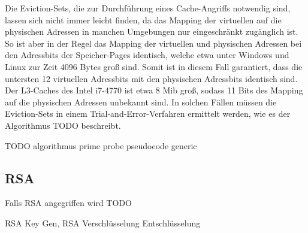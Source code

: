Die Eviction-Sets, die zur Durchführung eines Cache-Angriffs notwendig sind, lassen sich nicht immer leicht finden, da das Mapping der virtuellen auf die physischen Adressen in manchen Umgebungen nur eingeschränkt zugänglich ist.
So ist aber in der Regel das Mapping der virtuellen und physischen Adressen bei den Adressbits der Speicher-Pages identisch, welche etwa unter Windows und Linux zur Zeit 4096 Bytes groß sind. Somit ist in diesem Fall garantiert, dass die untersten 12 virtuellen Adressbits mit den physischen Adressbits identisch sind. Der L3-Caches des Intel i7-4770 ist etwa 8 Mib groß, sodass 11 Bits des Mapping auf die physischen Adressen unbekannt sind.
In solchen Fällen müssen die Eviction-Sets in einem Trial-and-Error-Verfahren ermittelt werden, wie es der Algorithmus TODO %
beschreibt.

TODO algorithmus prime probe pseudocode generic





\subsection{RSA}

Falls RSA angegriffen wird TODO

RSA Key Gen, RSA Verschlüsselung Entschlüsselung

